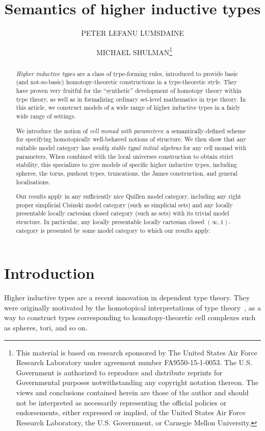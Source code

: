 \documentclass[referee]{psp}
\title{Semantics of higher inductive types}
\author[Peter LeFanu Lumsdaine and Michael Shulman]{PETER LEFANU LUMSDAINE \and\ MICHAEL SHULMAN\thanks{This material is based on research sponsored by The United States Air Force Research Laboratory under agreement number FA9550-15-1-0053.  The U.S. Government is authorized to reproduce and distribute reprints for Governmental purposes notwithstanding any copyright notation thereon.  The views and conclusions contained herein are those of the author and should not be interpreted as necessarily representing the official policies or endorsements, either expressed or implied, of the United States Air Force Research Laboratory, the U.S. Government, or Carnegie Mellon University.}}
\begin{document}
\maketitle

\begin{abstract}
  \emph{Higher inductive types} are a class of type-forming rules, introduced to provide basic (and not-so-basic) homotopy-theoretic constructions in a type-theoretic style.
  They have proven very fruitful for the ``synthetic'' development of homotopy theory within type theory, as well as in formalizing ordinary set-level mathematics in type theory.
  In this article, we construct models of a wide range of higher inductive types in a fairly wide range of settings.
  
  We introduce the notion of \emph{cell monad with parameters}: a semantically-defined scheme for specifying homotopically well-behaved notions of structure.
  We then show that any suitable model category has \emph{weakly stable typal initial algebras} for any cell monad with parameters.
  When combined with the local universes construction to obtain strict stability, this specializes to give models of specific higher inductive types, including spheres, the torus, pushout types, truncations, the James construction, and general localisations.

  Our results apply in any sufficiently nice Quillen model category, including any right proper simplicial Cisinski model category (such as simplicial sets) and any locally presentable locally cartesian closed category (such as sets) with its trivial model structure.
  In particular, any locally presentable locally cartesian closed $(\infty,1)$-category is presented by some model category to which our results apply.
\end{abstract}

\tableofcontents

\section{Introduction}
\label{sec:introduction}

Higher inductive types are a recent innovation in dependent type theory.
They were originally motivated by the homotopical interpretations of type theory~\cite{aw:htpy-idtype,klv:ssetmodel,hottbook}, as a way to construct types corresponding to homotopy-theoretic cell complexes such as spheres, tori, and so on.
\end{document}
